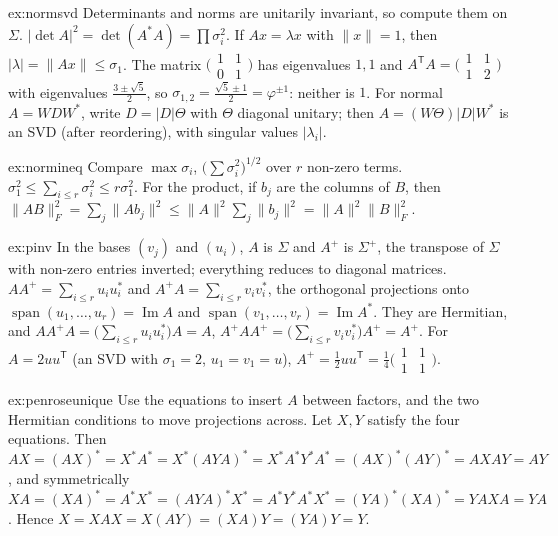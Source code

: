 \begin{solution}{ex:normsvd}
\idea Determinants and norms are unitarily invariant, so compute them on $\Sigma$.
\writeup $|\det A|^2=\det(A^*A)=\prod\sigma_i^2$. If $Ax=\lambda x$ with $\|x\|=1$, then $|\lambda|=\|Ax\|\le\sigma_1$. The matrix
$\bigl(\begin{smallmatrix}1&1\\0&1\end{smallmatrix}\bigr)$ has eigenvalues $1,1$ and $A^{\mathsf T}A=\bigl(\begin{smallmatrix}1&1\\1&2
\end{smallmatrix}\bigr)$ with eigenvalues $\frac{3\pm\sqrt5}2$, so $\sigma_{1,2}=\frac{\sqrt5\pm1}2=\varphi^{\pm1}$: neither
is $1$. For normal $A=WDW^*$, write $D=|D|\Theta$ with $\Theta$ diagonal unitary; then $A=(W\Theta)|D|W^*$ is an SVD (after
reordering), with singular values $|\lambda_i|$.
\end{solution}

\begin{solution}{ex:normineq}
\idea Compare $\max\sigma_i$, $\bigl(\sum\sigma_i^2\bigr)^{1/2}$ over $r$ non-zero terms.
\writeup $\sigma_1^2\le\sum_{i\le r}\sigma_i^2\le r\sigma_1^2$. For the product, if $b_j$ are the columns of $B$, then
$\|AB\|_F^2=\sum_j\|Ab_j\|^2\le\|A\|^2\sum_j\|b_j\|^2=\|A\|^2\|B\|_F^2$.
\end{solution}

\begin{solution}{ex:pinv}
\idea In the bases $(v_j)$ and $(u_i)$, $A$ is $\Sigma$ and $A^+$ is $\Sigma^+$, the transpose of $\Sigma$ with non-zero entries
inverted; everything reduces to diagonal matrices.
\writeup $AA^+=\sum_{i\le r}u_iu_i^*$ and $A^+A=\sum_{i\le r}v_iv_i^*$, the orthogonal projections onto $\operatorname{span}
(u_1,\dots,u_r)=\operatorname{Im}A$ and $\operatorname{span}(v_1,\dots,v_r)=\operatorname{Im}A^*$. They are Hermitian, and
$AA^+A=\bigl(\sum_{i\le r}u_iu_i^*\bigr)A=A$, $A^+AA^+=\bigl(\sum_{i\le r}v_iv_i^*\bigr)A^+=A^+$. For $A=2uu^{\mathsf T}$ (an SVD
with $\sigma_1=2$, $u_1=v_1=u$), $A^+=\frac12uu^{\mathsf T}=\frac14\bigl(\begin{smallmatrix}1&1\\1&1\end{smallmatrix}\bigr)$.
\end{solution}

\begin{solution}{ex:penroseunique}
\idea Use the equations to insert $A$ between factors, and the two Hermitian conditions to move projections across.
\writeup Let $X,Y$ satisfy the four equations. Then $AX=(AX)^*=X^*A^*=X^*(AYA)^*=X^*A^*Y^*A^*=(AX)^*(AY)^*=AXAY=AY$, and
symmetrically $XA=(XA)^*=A^*X^*=(AYA)^*X^*=A^*Y^*A^*X^*=(YA)^*(XA)^*=YAXA=YA$. Hence $X=XAX=X(AY)=(XA)Y=(YA)Y=Y$.
\end{solution}

